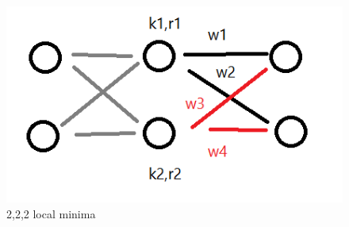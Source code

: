\documentclass[conference]{IEEEtran}
\begin{document}
\begin{figure}
	\includegraphics[width=\linewidth]{images/nn/222.png}
	\caption{2,2,2 local minima}
	\label{fig:222}
\end{figure}
\end{document}
